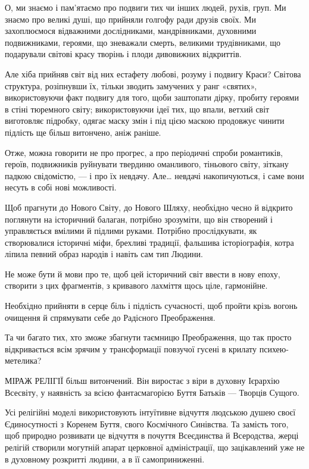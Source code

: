 О, ми знаємо і пам’ятаємо про подвиги тих чи інших людей, рухів, груп. Ми
знаємо про великі душі, що прийняли голгофу ради друзів своїх. Ми захоплюємося
відважними дослідниками, мандрівниками, духовними подвижниками, героями, що
зневажали смерть, великими трудівниками, що подарували світові красу творінь і
плоди дивовижних відкриттів.

Але хіба прийняв світ від них естафету любові, розуму і подвигу Краси? Світова
структура, розіпнувши їх, тільки зводить замучених у ранг «святих»,
використовуючи факт подвигу для того, щоби заштопати дірку, пробиту героями в
стіні тюремного світу; використовуючи ідеї тих, що впали, ветхий світ
виготовляє підробку, одягає маску змін і під цією маскою продовжує чинити
підлість ще більш витончено, аніж раніше.

Отже, можна говорити не про прогрес, а про періодичні спроби романтиків,
героїв, подвижників руйнувати твердиню оманливого, тіньового світу, зіткану
падкою свідомістю, — і про їх невдачу. Але… невдачі накопичуються, і саме вони
несуть в собі нові можливості.

Щоб прагнути до Нового Світу, до Нового Шляху, необхідно чесно й відкрито
поглянути на історичний балаган, потрібно зрозуміти, що він створений і
управляється вмілими й підлими руками. Потрібно прослідкувати, як створювалися
історичні міфи, брехливі традиції, фальшива історіографія, котра ліпила певний
образ народів і навіть сам тип Людини.

Не може бути й мови про те, щоб цей історичний світ ввести в нову епоху,
створити з цих фрагментів, з кривавого лахміття щось ціле, гармонійне.

Необхідно прийняти в серце біль і підлість сучасності, щоб пройти крізь вогонь
очищення й спрямувати себе до Радісного Преображення.

Та чи багато тих, хто зможе збагнути таємницю Преображення, що так просто
відкривається всім зрячим у трансформації повзучої гусені в крилату
психею-метелика?

МІРАЖ РЕЛІГІЇ більш витончений. Він виростає з віри в духовну Ієрархію
Всесвіту, у наявність за всією фантасмагорією Буття Батьків — Творців Сущого.

Усі релігійні моделі використовують інтуїтивне відчуття людською душею своєї
Єдиносутності з Коренем Буття, свого Космічного Синівства. Та замість того, щоб
природно розвивати це відчуття в почуття Всеєдинства й Всеродства, жерці
релігій створили могутній апарат церковної адміністрації, що зацікавлений уже
не в духовному розкритті людини, а в її самоприниженні.

